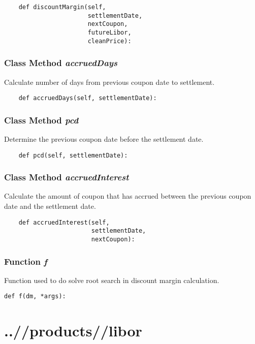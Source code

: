 \documentclass[twoside,11pt]{book}
\begin{document}
\begin{lstlisting}
    def discountMargin(self, 
                       settlementDate,
                       nextCoupon, 
                       futureLibor,
                       cleanPrice):
\end{lstlisting}

\subsection{Class Method {\it accruedDays}}
Calculate number of days from previous coupon date to settlement.

\begin{lstlisting}
    def accruedDays(self, settlementDate):
\end{lstlisting}

\subsection{Class Method {\it pcd}}
Determine the previous coupon date before the settlement date. 

\begin{lstlisting}
    def pcd(self, settlementDate):
\end{lstlisting}

\subsection{Class Method {\it accruedInterest}}
Calculate the amount of coupon that has accrued between the previous coupon date and the settlement date. 

\begin{lstlisting}
    def accruedInterest(self, 
                        settlementDate, 
                        nextCoupon):
\end{lstlisting}

\subsection{Function {\it f}}
Function used to do solve root search in discount margin calculation. 

\begin{lstlisting}
def f(dm, *args):
\end{lstlisting}


\chapter{..//products//libor}
\end{document}
